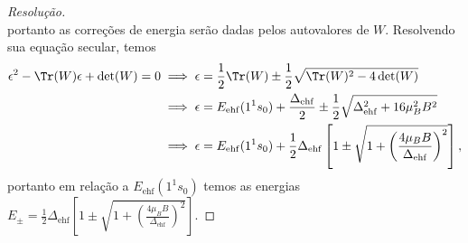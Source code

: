 \begin{proof}[Resolução]
\begin{equation*}
   \end{equation*}
   portanto as correções de energia serão dadas pelos autovalores de \(W\). Resolvendo sua equação secular, temos
   \begin{align*}
      \epsilon^2 - \Tr(W) \epsilon + \det(W) = 0 &\implies \epsilon = \frac12\Tr(W) \pm \frac12 \sqrt{\Tr(W)^2 - 4\det(W)}\\
                                                 &\implies \epsilon = E_{\mathrm{ehf}}(1^1s_0) + \frac{\Delta_{\mathrm{ehf}}}{2} \pm \frac12 
                                                 \sqrt{\Delta_{\mathrm{ehf}}^2 + 16\mu_B^2 B^2}\\
                                                 &\implies \epsilon = E_{\mathrm{ehf}}(1^1s_0) + \frac12 \Delta_{\mathrm{ehf}} \left[1 \pm \sqrt{1 + \left(\frac{4\mu_B B}{\Delta_{\mathrm{ehf}}}\right)^2}\right],
   \end{align*}
   portanto em relação a \(E_{\mathrm{ehf}}(1^1s_0)\) temos as energias \(E_{\pm} = \frac12 \Delta_{\mathrm{ehf}}\left[1 \pm \sqrt{1 + \left(\frac{4\mu_B B}{\Delta_{\mathrm{ehf}}}\right)^2}\right].\)
\end{proof}
